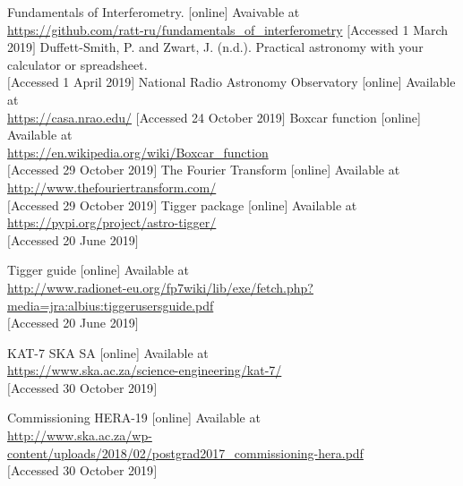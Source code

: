 \begin{thebibliography}{9}
Fundamentals of Interferometry. [online] Avaivable at\\
\url{https://github.com/ratt-ru/fundamentals_of_interferometry}
$[$Accessed 1 March 2019$]$
Duffett-Smith, P. and Zwart, J. (n.d.). Practical astronomy with your calculator or spreadsheet.\\
$[$Accessed 1 April 2019$]$
National Radio Astronomy Observatory [online] Available at\\
\url{https://casa.nrao.edu/}
$[$Accessed 24 October 2019$]$
Boxcar function [online] Available at\\
\url{https://en.wikipedia.org/wiki/Boxcar_function}\\
$[$Accessed 29 October 2019$]$
The Fourier Transform [online] Available at\\
\url{http://www.thefouriertransform.com/}\\
$[$Accessed 29 October 2019$]$
Tigger package [online] Available at\\
\url{https://pypi.org/project/astro-tigger/}\\
$[$Accessed 20 June 2019$]$

Tigger guide [online] Available at\\
\url{http://www.radionet-eu.org/fp7wiki/lib/exe/fetch.php?media=jra:albius:tiggerusersguide.pdf}\\
$[$Accessed 20 June 2019$]$

KAT-7 SKA SA [online] Available at \\
\url{https://www.ska.ac.za/science-engineering/kat-7/}\\
$[$Accessed 30 October 2019$]$

Commissioning HERA-19 [online] Available at \\
\url{http://www.ska.ac.za/wp-content/uploads/2018/02/postgrad2017_commissioning-hera.pdf}\\
$[$Accessed 30 October 2019$]$


\end{thebibliography}

